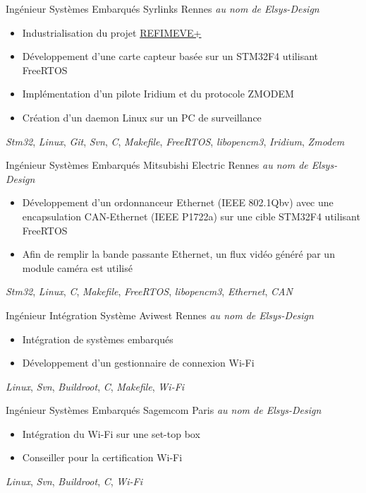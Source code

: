 \documentclass[11pt,a4paper,sans]{moderncv}
\begin{document}
	{Ingénieur Systèmes Embarqués}
	{Syrlinks}
	{Rennes}
	{\textit{au nom de Elsys-Design}}
	{
		\begin{itemize}
		\item Industrialisation du projet
			\href{http://www.refimeve.fr}{REFIMEVE+}
		\item Développement d'une carte capteur basée sur un STM32F4
			utilisant FreeRTOS
		\item Implémentation d'un pilote Iridium et du protocole ZMODEM
		\item Création d'un daemon Linux sur un PC de surveillance
		\end{itemize}
		\textit{Stm32},
		\textit{Linux},
		\textit{Git}, \textit{Svn},
		\textit{C}, \textit{Makefile},
		\textit{FreeRTOS}, \textit{libopencm3},
		\textit{Iridium}, \textit{Zmodem}
	}
	{Ingénieur Systèmes Embarqués}
	{Mitsubishi Electric}
	{Rennes}
	{\textit{au nom de Elsys-Design}}
	{
		\begin{itemize}
		\item Développement d'un ordonnanceur Ethernet (IEEE 802.1Qbv)
			avec une encapsulation CAN-Ethernet (IEEE P1722a)
				sur une cible STM32F4 utilisant FreeRTOS
		\item Afin de remplir la bande passante Ethernet, un flux vidéo
			généré par un module caméra est utilisé
		\end{itemize}
		\textit{Stm32},
		\textit{Linux},
		\textit{C}, \textit{Makefile},
		\textit{FreeRTOS}, \textit{libopencm3},
		\textit{Ethernet}, \textit{CAN}
	}
	{Ingénieur Intégration Système}
	{Aviwest}
	{Rennes}
	{\textit{au nom de Elsys-Design}}
	{
		\begin{itemize}
		\item Intégration de systèmes embarqués
		\item Développement d'un gestionnaire de connexion Wi-Fi
		\end{itemize}
		\textit{Linux},
		\textit{Svn},
		\textit{Buildroot},
		\textit{C}, \textit{Makefile},
		\textit{Wi-Fi}
	}
	{Ingénieur Systèmes Embarqués}
	{Sagemcom}
	{Paris}
	{\textit{au nom de Elsys-Design}}
	{
		\begin{itemize}
		\item Intégration du Wi-Fi sur une set-top box
		\item Conseiller pour la certification Wi-Fi
		\end{itemize}
		\textit{Linux},
		\textit{Svn},
		\textit{Buildroot},
		\textit{C},
		\textit{Wi-Fi}
	}
\end{document}
